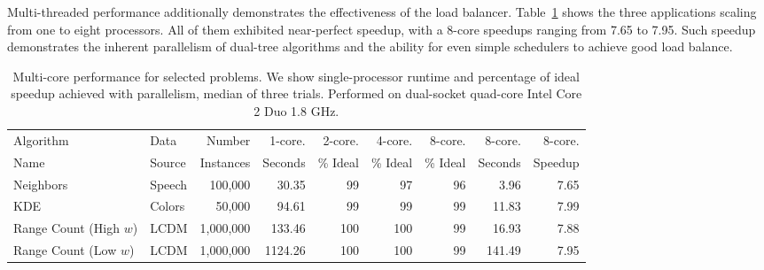 \documentclass[twoside,leqno,twocolumn]{article}
\newcommand{\fig}[1]{Figure~\ref{fig:#1}}
\newcommand{\tab}[1]{Table~\ref{tab:#1}}
\begin{document}
Multi-threaded performance additionally demonstrates the effectiveness of the load balancer.
\tab{maquis} shows the three applications scaling from one to eight processors.
All of them exhibited near-perfect speedup, with a 8-core speedups ranging from 7.65 to 7.95.
Such speedup demonstrates the inherent parallelism of dual-tree algorithms and the ability for even simple schedulers to achieve good load balance.

\begin{table}
  \centering
  \begin{tabular}{|l|l|r|r||r|r|r||r|r|}
    \hline
    Algorithm               & Data      & Number     & 1-core. & 2-core.  & 4-core.  & 8-core.  & 8-core. & 8-core.
    \\
    Name                    & Source    & Instances  & Seconds & \% Ideal & \% Ideal & \% Ideal & Seconds & Speedup
    \\ \hline \hline
    Neighbors               & Speech    & 100,000  & 30.35  & 99 & 97 & 96 & 3.96 & 7.65
    \\ \hline
    KDE                     & Colors    & 50,000    & 94.61 & 99 & 99 & 99 & 11.83 & 7.99
    \\ \hline
    Range Count (High $w$)  & LCDM      & 1,000,000  & 133.46 & 100 & 100 & 99 & 16.93 & 7.88
    \\ \hline
    Range Count (Low $w$)   & LCDM      & 1,000,000 & 1124.26 & 100 & 100 & 99 & 141.49 & 7.95
    \\ \hline
  \end{tabular}
  \caption{
  \label{tab:maquis}
  Multi-core performance for selected problems.
  We show single-processor runtime and percentage of ideal speedup achieved with parallelism, median of three trials.
  Performed on dual-socket quad-core Intel Core 2 Duo 1.8 GHz.
  }
\end{table}

\end{document}
